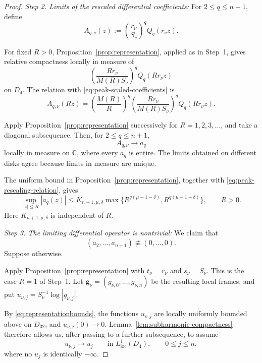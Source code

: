 \documentclass[12pt,letterpaper,reqno]{amsart}
\theoremstyle{definition}
\numberwithin{equation}{section}
\newcommand{\C}{\mathbb C}
\newcommand{\loc}{\mathrm{loc}}
\newcommand{\gv}{\bm g}
\begin{document}
\begin{proof}
\medskip\noindent
\emph{{Step 2. Limits of the rescaled differential coefficients:}}
For \(2\leq q\leq n+1\), define
\begin{equation}\label{eq:peak-scaled-coefficients}
 A_{q,\nu}(z)
 :=
 \left(\frac{r_\nu}{S_\nu}\right)^q
 Q_q(r_\nu z).
\end{equation}

For fixed \(R>0\), Proposition~\ref{prop:representation}, applied as in
Step~1, gives relative compactness locally in measure of
\[
\left(
\frac{Rr_\nu}{M(R)S_\nu}
\right)^q
Q_q(Rr_\nu z)
\]
on \(D_4\). The relation with \eqref{eq:peak-scaled-coefficients} is
\begin{equation}\label{eq:peak-rescaling-relation}
 A_{q,\nu}(Rz)
 =
 \left(\frac{M(R)}{R}\right)^q
 \left(
 \frac{Rr_\nu}{M(R)S_\nu}
 \right)^q
 Q_q(Rr_\nu z).
\end{equation}

Apply Proposition~\ref{prop:representation} successively for
\(R=1,2,3,\ldots\), and take a diagonal subsequence. Then, for
\(2\leq q\leq n+1\),
\[
A_{q,\nu}\longrightarrow a_q
\]
locally in measure on \(\C\), where every \(a_q\) is entire.
The limits obtained on different disks agree because limits in measure
are unique.

The uniform bound in Proposition~\ref{prop:representation}, together
with \eqref{eq:peak-rescaling-relation}, gives
\begin{equation}\label{eq:peak-coefficient-bound}
 \sup_{|z|\leq R}|a_q(z)|
 \leq
 K_{n+1,\mu,\delta}
 \max\{
 R^{q(\mu-1-\delta)},
 R^{q(\mu-1+\delta)}
 \},
 \qquad
 R>0.
\end{equation}
Here \(K_{n+1,\mu,\delta}\) is independent of \(R\).


\medskip\noindent
\emph{{Step 3. The limiting differential operator is nontrivial:}}
We claim that
\[
(a_2,\ldots,a_{n+1})\not\equiv(0,\ldots,0).
\]
Suppose otherwise.

Apply Proposition~\ref{prop:representation} with
\(t_\nu=r_\nu\) and \(s_\nu=S_\nu\). This is the case \(R=1\) of
Step~1. Let
\(\gv_\nu=(g_{\nu,0},\ldots,g_{\nu,n})\)
be the resulting local frames, and put
\(u_{\nu,j}=S_\nu^{-1}\log|g_{\nu,j}|\).

By \eqref{eq:representationbounds}, the functions \(u_{\nu,j}\) are
locally uniformly bounded above on \(D_{32}\), and
\(u_{\nu,j}(0)\to0\). Lemma~\ref{lem:subharmonic-compactness} therefore
allows us, after passing to a further subsequence, to assume
\begin{equation}\label{eq:peak-component-limits}
 u_{\nu,j}
 \longrightarrow
 u_j
 \qquad\text{in }L^1_{\loc}(D_4),
 \qquad
 0\leq j\leq n,
\end{equation}
where no \(u_j\) is identically \(-\infty\).


\end{proof}
\end{document}
